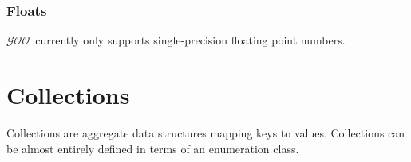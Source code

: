 \documentclass[twoside,twocolumn,9pt]{extarticle}
\newcommand{\goo}{$\mathcal{GOO}$}
\begin{document}
\subsubsection{Floats}

\goo\ currently only supports single-precision floating point numbers.

\begin{defs}
\end{defs}

\section{Collections}

Collections are aggregate data structures mapping keys to values.
Collections can be almost entirely defined in terms of an enumeration class.

% 
\end{document}
